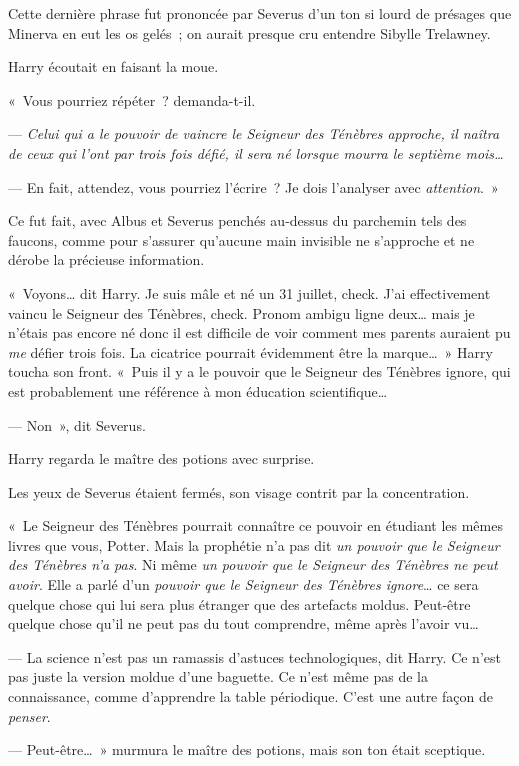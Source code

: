 Cette dernière phrase fut prononcée par Severus d'un ton si lourd de présages que Minerva en eut les os gelés~; on aurait presque cru entendre Sibylle Trelawney.

Harry écoutait en faisant la moue.

«~Vous pourriez répéter~? demanda-t-il.

--- \emph{Celui qui a le pouvoir de vaincre le Seigneur des Ténèbres approche, il naîtra de ceux qui l'ont par trois fois défié, il sera né lorsque mourra le septième mois…}

--- En fait, attendez, vous pourriez l'écrire~? Je dois l'analyser avec \emph{attention}.~»

Ce fut fait, avec Albus et Severus penchés au-dessus du parchemin tels des faucons, comme pour s'assurer qu'aucune main invisible ne s'approche et ne dérobe la précieuse information.

«~Voyons… dit Harry. Je suis mâle et né un 31 juillet, check. J'ai effectivement vaincu le Seigneur des Ténèbres, check. Pronom ambigu ligne deux… mais je n'étais pas encore né donc il est difficile de voir comment mes parents auraient pu \emph{me} défier trois fois. La cicatrice pourrait évidemment être la marque…~» Harry toucha son front. «~Puis il y a le pouvoir que le Seigneur des Ténèbres ignore, qui est probablement une référence à mon éducation scientifique…

--- Non~», dit Severus.

Harry regarda le maître des potions avec surprise.

Les yeux de Severus étaient fermés, son visage contrit par la concentration.

«~Le Seigneur des Ténèbres pourrait connaître ce pouvoir en étudiant les mêmes livres que vous, Potter. Mais la prophétie n'a pas dit \emph{un pouvoir que le Seigneur des Ténèbres n'a pas}. Ni même \emph{un pouvoir que le Seigneur des Ténèbres ne peut avoir}. Elle a parlé d'un \emph{pouvoir que le Seigneur des Ténèbres ignore}… ce sera quelque chose qui lui sera plus étranger que des artefacts moldus. Peut-être quelque chose qu'il ne peut pas du tout comprendre, même après l'avoir vu…

--- La science n'est pas un ramassis d'astuces technologiques, dit Harry. Ce n'est pas juste la version moldue d'une baguette. Ce n'est même pas de la connaissance, comme d'apprendre la table périodique. C'est une autre façon de \emph{penser}.

--- Peut-être…~» murmura le maître des potions, mais son ton était sceptique.

